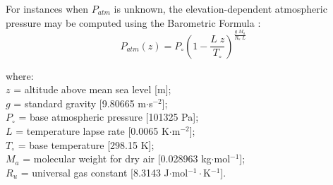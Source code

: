 \noindent For instances when $P_{atm}$ is unknown, the elevation-dependent atmospheric pressure may be computed using the Barometric Formula \parencite{allen98}:
%
\begin{equation}
\label{eq:pz}
    P_{atm}\left( z \right) = P_{\circ} \left( 
    	1 - \frac{L\; z}{T_{\circ}} 
    \right)^{\frac{g\; M_a}{R_u\; L}}
\end{equation}

\noindent where:\\
\indent $z$ = altitude above mean sea level [m];\\
\indent $g$ = standard gravity [9.80665 m$\cdot$s$^{-2}$];\\
\indent $P_{\circ}$ = base atmospheric pressure [101325 Pa];\\
\indent $L$ = temperature lapse rate [0.0065 K$\cdot$m$^{-2}$];\\
\indent $T_{\circ}$ = base temperature [298.15 K];\\
\indent $M_a$ = molecular weight for dry air [0.028963 kg$\cdot$mol$^{-1}$];\\
\indent $R_u$ = universal gas constant [8.3143 J$\cdot$mol$^{-1}\cdot$K$^{-1}$].\\

